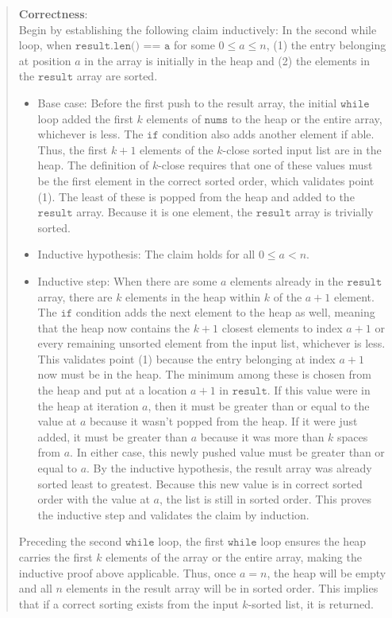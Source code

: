 \documentclass[11pt]{article}
\newcommand{\code}[1]{$\texttt{#1}$}
\begin{document}
\begin{enumerate}
\begin{quote}
  \medskip
  \textbf{Correctness}: \\ 
  Begin by establishing the following claim inductively: In the second while loop, when \code{result.len() == a} for some $0 \leq a \leq n$, (1) the entry belonging at position $a$ in the array is initially in the heap and (2) the elements in the \code{result} array are sorted.
  \begin{itemize}
    \item Base case: Before the first push to the result array, the initial \code{while} loop added the first $k$ elements of \code{nums} to the heap or the entire array, whichever is less. The \code{if} condition also adds another element if able. Thus, the first $k + 1$ elements of the $k$-close sorted input list are in the heap. The definition of $k$-close requires that one of these values must be the first element in the correct sorted order, which validates point (1). The least of these is popped from the heap and added to the \code{result} array. Because it is one element, the \code{result} array is trivially sorted. 
    \item Inductive hypothesis: The claim holds for all $0 \leq a < n$.
    \item Inductive step: When there are some $a$ elements already in the \code{result} array, there are $k$ elements in the heap within $k$ of the $a + 1$ element. The \code{if} condition adds the next element to the heap as well, meaning that the heap now contains the $k + 1$ closest elements to index $a + 1$ or every remaining unsorted element from the input list, whichever is less. This validates point (1) because the entry belonging at index $a + 1$ now must be in the heap. The minimum among these is chosen from the heap and put at a location $a + 1$ in \code{result}. If this value were in the heap at iteration $a$, then it must be greater than or equal to the value at $a$ because it wasn't popped from the heap. If it were just added, it must be greater than $a$ because it was more than $k$ spaces from $a$. In either case, this newly pushed value must be greater than or equal to $a$. By the inductive hypothesis, the result array was already sorted least to greatest. Because this new value is in correct sorted order with the value at $a$, the list is still in sorted order. This proves the inductive step and validates the claim by induction. 
  \end{itemize}

      \medskip
      Preceding the second \code{while} loop, the first \code{while} loop ensures the heap carries the first $k$ elements of the array or the entire array, making the inductive proof above applicable. Thus, once $a = n$, the heap will be empty and all $n$ elements in the result array will be in sorted order. This implies that if a correct sorting exists from the input $k$-sorted list, it is returned. 


\end{quote}
\end{enumerate}
\end{document}
